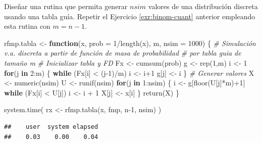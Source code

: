\documentclass[
]{book}
\newenvironment{Shaded}{\begin{snugshade}}{\end{snugshade}}
\newcommand{\AttributeTok}[1]{\textcolor[rgb]{0.77,0.63,0.00}{#1}}
\newcommand{\CommentTok}[1]{\textcolor[rgb]{0.56,0.35,0.01}{\textit{#1}}}
\newcommand{\ControlFlowTok}[1]{\textcolor[rgb]{0.13,0.29,0.53}{\textbf{#1}}}
\newcommand{\DecValTok}[1]{\textcolor[rgb]{0.00,0.00,0.81}{#1}}
\newcommand{\FunctionTok}[1]{\textcolor[rgb]{0.00,0.00,0.00}{#1}}
\newcommand{\NormalTok}[1]{#1}
\newcommand{\OtherTok}[1]{\textcolor[rgb]{0.56,0.35,0.01}{#1}}
\newcommand{\SpecialCharTok}[1]{\textcolor[rgb]{0.00,0.00,0.00}{#1}}
\theoremstyle{break}
\theoremstyle{definition}
\theoremstyle{definition}
\theoremstyle{definition}
\theoremstyle{definition}
\theoremstyle{remark}
\begin{document}
Diseñar una rutina que permita generar \(nsim\) valores de una
distribución discreta usando una tabla guía.
Repetir el Ejercicio \ref{exr:binom-cuant} anterior empleando esta rutina con \(m=n-1\).

\begin{Shaded}
\begin{Highlighting}[]
\NormalTok{rfmp.tabla }\OtherTok{\textless{}{-}} \ControlFlowTok{function}\NormalTok{(x, }\AttributeTok{prob =} \DecValTok{1}\SpecialCharTok{/}\FunctionTok{length}\NormalTok{(x), m, }\AttributeTok{nsim =} \DecValTok{1000}\NormalTok{) \{}
  \CommentTok{\# Simulación v.a. discreta a partir de función de masa de probabilidad}
  \CommentTok{\# por tabla guia de tamaño m}
  \CommentTok{\# Inicializar tabla y FD}
\NormalTok{  Fx }\OtherTok{\textless{}{-}} \FunctionTok{cumsum}\NormalTok{(prob)}
\NormalTok{  g }\OtherTok{\textless{}{-}} \FunctionTok{rep}\NormalTok{(}\DecValTok{1}\NormalTok{,m)}
\NormalTok{  i }\OtherTok{\textless{}{-}} \DecValTok{1}
  \ControlFlowTok{for}\NormalTok{(j }\ControlFlowTok{in} \DecValTok{2}\SpecialCharTok{:}\NormalTok{m) \{}
    \ControlFlowTok{while}\NormalTok{ (Fx[i] }\SpecialCharTok{\textless{}}\NormalTok{ (j}\DecValTok{{-}1}\NormalTok{)}\SpecialCharTok{/}\NormalTok{m) i }\OtherTok{\textless{}{-}}\NormalTok{ i}\SpecialCharTok{+}\DecValTok{1}
\NormalTok{    g[j] }\OtherTok{\textless{}{-}}\NormalTok{ i}
\NormalTok{  \}}
  \CommentTok{\# Generar valores}
\NormalTok{  X }\OtherTok{\textless{}{-}} \FunctionTok{numeric}\NormalTok{(nsim)}
\NormalTok{  U }\OtherTok{\textless{}{-}} \FunctionTok{runif}\NormalTok{(nsim)}
  \ControlFlowTok{for}\NormalTok{(j }\ControlFlowTok{in} \DecValTok{1}\SpecialCharTok{:}\NormalTok{nsim) \{}
\NormalTok{    i }\OtherTok{\textless{}{-}}\NormalTok{ g[}\FunctionTok{floor}\NormalTok{(U[j]}\SpecialCharTok{*}\NormalTok{m)}\SpecialCharTok{+}\DecValTok{1}\NormalTok{]}
    \ControlFlowTok{while}\NormalTok{ (Fx[i] }\SpecialCharTok{\textless{}}\NormalTok{ U[j]) i }\OtherTok{\textless{}{-}}\NormalTok{ i }\SpecialCharTok{+} \DecValTok{1}
\NormalTok{    X[j] }\OtherTok{\textless{}{-}}\NormalTok{ x[i]}
\NormalTok{  \}}
  \FunctionTok{return}\NormalTok{(X)}
\NormalTok{\}}

\FunctionTok{system.time}\NormalTok{( rx }\OtherTok{\textless{}{-}} \FunctionTok{rfmp.tabla}\NormalTok{(x, fmp, n}\DecValTok{{-}1}\NormalTok{, nsim) )}
\end{Highlighting}
\end{Shaded}

\begin{verbatim}
##    user  system elapsed 
##    0.03    0.00    0.04
\end{verbatim}
\end{document}
